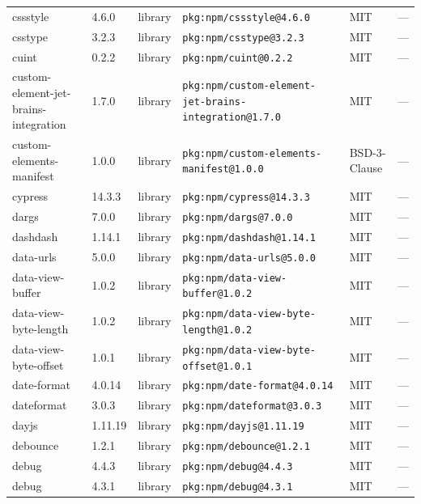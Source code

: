 \documentclass[11pt,a4paper]{article}
\begin{document}
\begin{longtable}{|p{4cm}|p{2cm}|p{1.6cm}|p{5cm}|p{1.5cm}|p{3.5cm}|}
\raggedright cssstyle & 4.6.0 & library & \small\texttt{pkg:npm/cssstyle@4.6.0} & MIT & \small — \\
\raggedright csstype & 3.2.3 & library & \small\texttt{pkg:npm/csstype@3.2.3} & MIT & \small — \\
\raggedright cuint & 0.2.2 & library & \small\texttt{pkg:npm/cuint@0.2.2} & MIT & \small — \\
\raggedright custom-element-jet-brains-integration & 1.7.0 & library & \small\texttt{pkg:npm/custom-element-jet-brains-integration@1.7.0} & MIT & \small — \\
\raggedright custom-elements-manifest & 1.0.0 & library & \small\texttt{pkg:npm/custom-elements-manifest@1.0.0} & BSD-3-Clause & \small — \\
\raggedright cypress & 14.3.3 & library & \small\texttt{pkg:npm/cypress@14.3.3} & MIT & \small — \\
\raggedright dargs & 7.0.0 & library & \small\texttt{pkg:npm/dargs@7.0.0} & MIT & \small — \\
\raggedright dashdash & 1.14.1 & library & \small\texttt{pkg:npm/dashdash@1.14.1} & MIT & \small — \\
\raggedright data-urls & 5.0.0 & library & \small\texttt{pkg:npm/data-urls@5.0.0} & MIT & \small — \\
\raggedright data-view-buffer & 1.0.2 & library & \small\texttt{pkg:npm/data-view-buffer@1.0.2} & MIT & \small — \\
\raggedright data-view-byte-length & 1.0.2 & library & \small\texttt{pkg:npm/data-view-byte-length@1.0.2} & MIT & \small — \\
\raggedright data-view-byte-offset & 1.0.1 & library & \small\texttt{pkg:npm/data-view-byte-offset@1.0.1} & MIT & \small — \\
\raggedright date-format & 4.0.14 & library & \small\texttt{pkg:npm/date-format@4.0.14} & MIT & \small — \\
\raggedright dateformat & 3.0.3 & library & \small\texttt{pkg:npm/dateformat@3.0.3} & MIT & \small — \\
\raggedright dayjs & 1.11.19 & library & \small\texttt{pkg:npm/dayjs@1.11.19} & MIT & \small — \\
\raggedright debounce & 1.2.1 & library & \small\texttt{pkg:npm/debounce@1.2.1} & MIT & \small — \\
\raggedright debug & 4.4.3 & library & \small\texttt{pkg:npm/debug@4.4.3} & MIT & \small — \\
\raggedright debug & 4.3.1 & library & \small\texttt{pkg:npm/debug@4.3.1} & MIT & \small — \\

\end{longtable}
\end{document}
